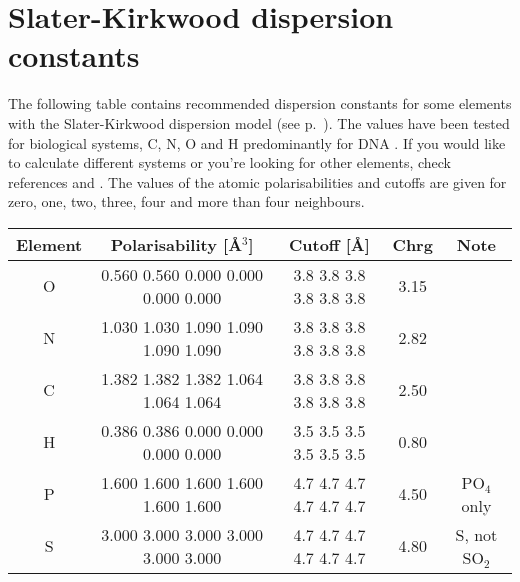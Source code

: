 \chapter{Slater-Kirkwood dispersion constants}
\label{app:dispconsts}

The following table contains recommended dispersion constants for some elements
with the Slater-Kirkwood dispersion model (see
p.~). The values have been tested for biological
systems, C, N, O and H predominantly for DNA \cite{elstner-jcp-114-5149}. If you
would like to calculate different systems or you're looking for other elements,
check references \cite{miller-JAmChemSoc-112-8533} and
\cite{kang-TheorChimActa-61-41}. The values of the atomic polarisabilities and
cutoffs are given for zero, one, two, three, four and more than four neighbours.

\begin{center}
\begin{tabular}{|c|c|c|c|c|} \hline
Element & Polarisability [\AA$^3$] & Cutoff [\AA] & Chrg & Note \\
\hline
O & 0.560 0.560 0.000 0.000 0.000 0.000 & 3.8 3.8 3.8 3.8 3.8 3.8 &
3.15 & \\
N & 1.030 1.030 1.090 1.090 1.090 1.090 & 3.8 3.8 3.8 3.8 3.8 3.8 &
2.82 & \\
C & 1.382 1.382 1.382 1.064 1.064 1.064 & 3.8 3.8 3.8 3.8 3.8 3.8 &
2.50 & \\
H & 0.386 0.386 0.000 0.000 0.000 0.000 & 3.5 3.5 3.5 3.5 3.5 3.5 &
0.80 & \\
P & 1.600 1.600 1.600 1.600 1.600 1.600 & 4.7 4.7 4.7 4.7 4.7 4.7 &
4.50 & PO$_4$ only \\
S & 3.000 3.000 3.000 3.000 3.000 3.000 & 4.7 4.7 4.7 4.7 4.7 4.7 &
4.80 & S, not SO$_2$ \\
\hline
\end{tabular}
\end{center}

